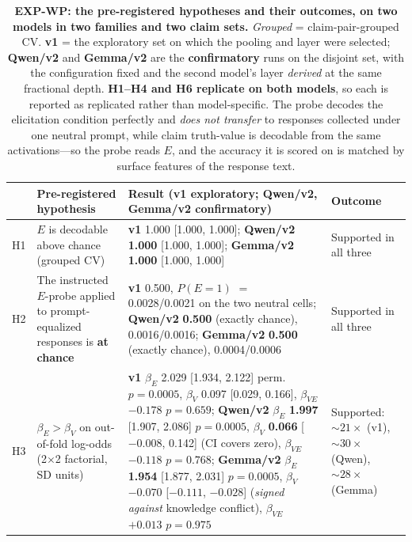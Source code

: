 \begin{table}[h]
\centering
\caption{\textbf{EXP-WP: the pre-registered hypotheses and their outcomes, on two models in two families and two claim sets.} \emph{Grouped} = claim-pair-grouped CV. \textbf{v1} = the exploratory set on which the pooling and layer were selected; \textbf{Qwen/v2} and \textbf{Gemma/v2} are the \textbf{confirmatory} runs on the disjoint set, with the configuration fixed and the second model's layer \emph{derived} at the same fractional depth. \textbf{H1--H4 and H6 replicate on both models}, so each is reported as replicated rather than model-specific. The probe decodes the elicitation condition perfectly and \emph{does not transfer} to responses collected under one neutral prompt, while claim truth-value is decodable from the same activations---so the probe reads $E$, and the accuracy it is scored on is matched by surface features of the response text.}
\label{tab:probe_audit}
\begin{scriptsize}
\setlength{\tabcolsep}{4pt}
\begin{tabular}{@{}p{0.24in}p{1.30in}p{2.55in}p{0.87in}@{}}
\toprule
& \textbf{Pre-registered hypothesis} & \textbf{Result (v1 exploratory; Qwen/v2, Gemma/v2 confirmatory)} & \textbf{Outcome} \\
\midrule
H1 & $E$ is decodable above chance (grouped CV) & \textbf{v1} 1.000 [1.000, 1.000]; \textbf{Qwen/v2} \textbf{1.000} [1.000, 1.000]; \textbf{Gemma/v2} \textbf{1.000} [1.000, 1.000] & Supported in all three \\
\addlinespace[1pt]
H2 & The instructed $E$-probe applied to prompt-equalized responses is \textbf{at chance} & \textbf{v1} 0.500, $P(E\!=\!1)$ $=$ 0.0028/0.0021 on the two neutral cells; \textbf{Qwen/v2} \textbf{0.500} (exactly chance), 0.0016/0.0016; \textbf{Gemma/v2} \textbf{0.500} (exactly chance), 0.0004/0.0006 & Supported in all three \\
\addlinespace[1pt]
H3 & $\beta_E > \beta_V$ on out-of-fold log-odds (2$\times$2 factorial, SD units) & \textbf{v1} $\beta_E$ 2.029 [1.934, 2.122] perm.\ $p\!=\!0.0005$, $\beta_V$ 0.097 [0.029, 0.166], $\beta_{VE}$ $-0.178$ $p\!=\!0.659$; \textbf{Qwen/v2} $\beta_E$ \textbf{1.997} [1.907, 2.086] $p\!=\!0.0005$, $\beta_V$ \textbf{0.066} [$-0.008$, 0.142] (CI covers zero), $\beta_{VE}$ $-0.118$ $p\!=\!0.768$; \textbf{Gemma/v2} $\beta_E$ \textbf{1.954} [1.877, 2.031] $p\!=\!0.0005$, $\beta_V$ \textbf{$-0.070$} [$-0.111$, $-0.028$] (\emph{signed against} knowledge conflict), $\beta_{VE}$ $+0.013$ $p\!=\!0.975$ & Supported: ${\sim}21\times$ (v1), ${\sim}30\times$ (Qwen), ${\sim}28\times$ (Gemma) \\

\end{tabular}
\end{scriptsize}
\end{table}
